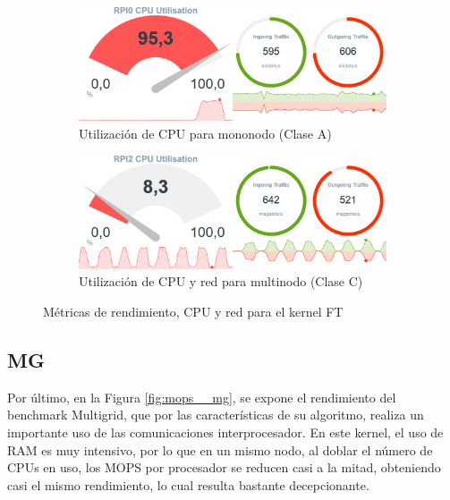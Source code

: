 \begin{figure}[h!]
    \begin{subfigure}[c]{0.75\textwidth}
        \includegraphics[width=\textwidth]{img/benchmark_rev/ft_rev_sn.png}
        \caption{Utilización de CPU para mononodo (Clase A)}
        \label{fig:mops_rev_sn__ft}
    \end{subfigure}

    \vspace{0.5cm}
    
    \begin{subfigure}[c]{0.75\textwidth}
        \includegraphics[width=\textwidth]{img/benchmark_rev/ft_rev_mn.png}
        \caption{Utilización de CPU y red para multinodo (Clase C)}
        \label{fig:mops_rev_mn__ft}
    \end{subfigure}
    \caption{Métricas de rendimiento, CPU y red para el kernel FT}
    \label{fig:mops__ft}
\end{figure}

\subsection{MG}
\label{ssec:comparacion_resultados__mg}
Por último, en la Figura \ref{fig:mops__mg}, se expone el rendimiento del benchmark Multigrid, que por las características de su algoritmo, realiza un importante uso de las comunicaciones interprocesador. En este kernel, el uso de RAM es muy intensivo, por lo que en un mismo nodo, al doblar el número de CPUs en uso, los MOPS por procesador se reducen casi a la mitad, obteniendo casi el mismo rendimiento, lo cual resulta bastante decepcionante.


